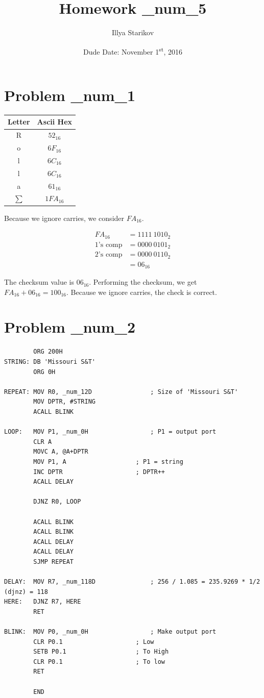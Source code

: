 \documentclass[12pt]{article}
\title{Homework \_num_5}
\date{Dude Date: November 1\textsuperscript{st}, 2016}
\author{Illya Starikov}
\begin{document}
\maketitle

\section{Problem \_num_1}
\begin{center}
    \begin{tabular}{|c|c|}
        \hline
        \textbf{Letter} & \textbf{Ascii Hex} \\ \hline
        R  & $52_{16}$ \\ \hline
        o  & $6F_{16}$ \\ \hline
        l  & $6C_{16}$ \\ \hline
        l  & $6C_{16}$ \\ \hline
        a  & $61_{16}$ \\ \hline
        $\sum$      & $1FA_{16}$ \\ \hline
    \end{tabular}
\end{center}
Because we ignore carries, we consider $FA_{16}$.

\begin{align*}
    FA_{16} &= 1111 \ 1010_{2} \\
    \text{1's comp} &= 0000 \ 0101_{2} \\
    \text{2's comp} &= 0000 \ 0110_{2} \\
    &= 06_{16}
\end{align*}

The checksum value is $06_{16}$. Performing the checksum, we get $FA_{16} + 06_{16} = 100_{16}$. Because we ignore carries, the check is correct.

\section{Problem \_num_2}
\begin{verbatim}
        ORG 200H
STRING: DB 'Missouri S&T'
        ORG 0H

REPEAT: MOV R0, _num_12D                ; Size of 'Missouri S&T'
        MOV DPTR, #STRING
        ACALL BLINK

LOOP:   MOV P1, _num_0H                 ; P1 = output port
        CLR A
        MOVC A, @A+DPTR
        MOV P1, A                   ; P1 = string
        INC DPTR                    ; DPTR++
        ACALL DELAY

        DJNZ R0, LOOP

        ACALL BLINK
        ACALL BLINK
        ACALL DELAY
        ACALL DELAY
        SJMP REPEAT

DELAY:  MOV R7, _num_118D               ; 256 / 1.085 = 235.9269 * 1/2 (djnz) = 118
HERE:   DJNZ R7, HERE
        RET

BLINK:  MOV P0, _num_0H                 ; Make output port
        CLR P0.1                    ; Low
        SETB P0.1                   ; To High
        CLR P0.1                    ; To low
        RET

        END
\end{verbatim}
\end{document}
